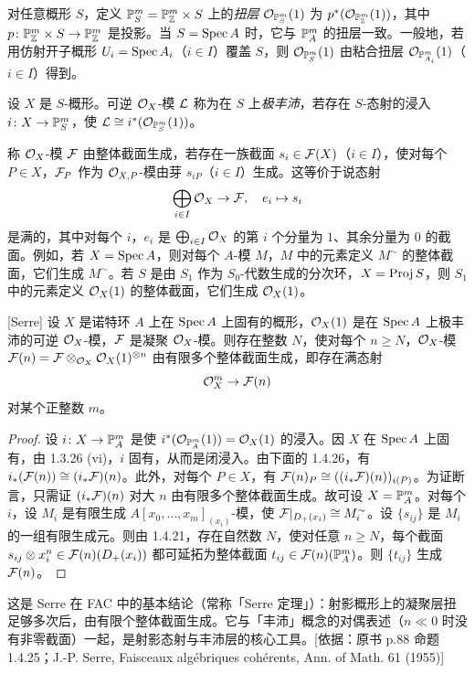 对任意概形 $S$，定义 $\mathbb{P}_S^m=\mathbb{P}_{\mathbb{Z}}^m\times S$ 上的\emph{扭层} $\mathcal{O}_{\mathbb{P}_S^m}(1)$ 为 $p^*(\mathcal{O}_{\mathbb{P}_{\mathbb{Z}}^m}(1))$，其中 $p\colon\mathbb{P}_{\mathbb{Z}}^m\times S\to\mathbb{P}_{\mathbb{Z}}^m$ 是投影。当 $S=\operatorname{Spec} A$ 时，它与 $\mathbb{P}_A^m$ 的扭层一致。一般地，若用仿射开子概形 $U_i=\operatorname{Spec} A_i$（$i\in I$）覆盖 $S$，则 $\mathcal{O}_{\mathbb{P}_S^m}(1)$ 由粘合扭层 $\mathcal{O}_{\mathbb{P}_{A_i}^m}(1)$（$i\in I$）得到。

设 $X$ 是 $S$-概形。可逆 $\mathcal{O}_X$-模 $\mathcal{L}$ 称为在 $S$ 上\emph{极丰沛}，若存在 $S$-态射的浸入 $i\colon X\to\mathbb{P}_S^m$，使 $\mathcal{L}\cong i^*(\mathcal{O}_{\mathbb{P}_S^m}(1))$。

称 $\mathcal{O}_X$-模 $\mathcal{F}$ 由整体截面生成，若存在一族截面 $s_i\in\mathcal{F}(X)$（$i\in I$），使对每个 $P\in X$，$\mathcal{F}_P$ 作为 $\mathcal{O}_{X,P}$-模由芽 $s_{iP}$（$i\in I$）生成。这等价于说态射
\[
\bigoplus_{i\in I}\mathcal{O}_X\to\mathcal{F},\quad e_i\mapsto s_i
\]
是满的，其中对每个 $i$，$e_i$ 是 $\bigoplus_{i\in I}\mathcal{O}_X$ 的第 $i$ 个分量为 $1$、其余分量为 $0$ 的截面。例如，若 $X=\operatorname{Spec} A$，则对每个 $A$-模 $M$，$M$ 中的元素定义 $M^\sim$ 的整体截面，它们生成 $M^\sim$。若 $S$ 是由 $S_1$ 作为 $S_0$-代数生成的分次环，$X=\operatorname{Proj} S$，则 $S_1$ 中的元素定义 $\mathcal{O}_X(1)$ 的整体截面，它们生成 $\mathcal{O}_X(1)$。

\begin{proposition}\label{it:1.4.25}[Serre]
设 $X$ 是诺特环 $A$ 上在 $\operatorname{Spec} A$ 上固有的概形，$\mathcal{O}_X(1)$ 是在 $\operatorname{Spec} A$ 上极丰沛的可逆 $\mathcal{O}_X$-模，$\mathcal{F}$ 是凝聚 $\mathcal{O}_X$-模。则存在整数 $N$，使对每个 $n\ge N$，$\mathcal{O}_X$-模 $\mathcal{F}(n)=\mathcal{F}\otimes_{\mathcal{O}_X}\mathcal{O}_X(1)^{\otimes n}$ 由有限多个整体截面生成，即存在满态射
\[
\mathcal{O}_X^m\to\mathcal{F}(n)
\]
对某个正整数 $m$。
\end{proposition}

\begin{proof}
设 $i\colon X\to\mathbb{P}_A^m$ 是使 $i^*(\mathcal{O}_{\mathbb{P}_A^m}(1))=\mathcal{O}_X(1)$ 的浸入。因 $X$ 在 $\operatorname{Spec} A$ 上固有，由 1.3.26 (vi)，$i$ 固有，从而是闭浸入。由下面的 1.4.26，有 $i_*(\mathcal{F}(n))\cong(i_*\mathcal{F})(n)$。此外，对每个 $P\in X$，有 $\mathcal{F}(n)_P\cong((i_*\mathcal{F})(n))_{i(P)}$。为证断言，只需证 $(i_*\mathcal{F})(n)$ 对大 $n$ 由有限多个整体截面生成。故可设 $X=\mathbb{P}_A^m$。对每个 $i$，设 $M_i$ 是有限生成 $A[x_0,\dots,x_m]_{(x_i)}$-模，使 $\mathcal{F}|_{D_+(x_i)}\cong M_i^\sim$。设 $\{s_{ij}\}$ 是 $M_i$ 的一组有限生成元。则由 1.4.21，存在自然数 $N$，使对任意 $n\ge N$，每个截面 $s_{ij}\otimes x_i^n\in\mathcal{F}(n)(D_+(x_i))$ 都可延拓为整体截面 $t_{ij}\in\mathcal{F}(n)(\mathbb{P}_A^m)$。则 $\{t_{ij}\}$ 生成 $\mathcal{F}(n)$。
\end{proof}

\begin{tnote}
这是 Serre 在 FAC 中的基本结论（常称「Serre 定理」）：射影概形上的凝聚层扭足够多次后，由有限个整体截面生成。它与「丰沛」概念的对偶表述（$n\ll0$ 时没有非零截面）一起，是射影态射与丰沛层的核心工具。[依据：原书 p.88 命题 1.4.25；J.-P. Serre, Faisceaux algébriques cohérents, Ann. of Math. 61 (1955)]
\end{tnote}

